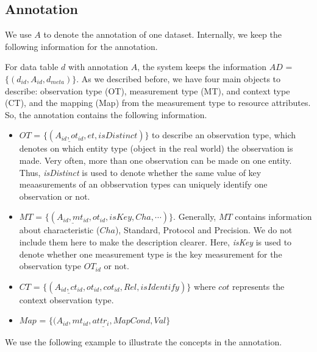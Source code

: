 \documentclass[conference]{IEEEtran}
\begin{document}
\subsection{Annotation}\label{sec:annotation}



We use $A$ to denote the annotation of one dataset. 
Internally, we keep the following information for the
annotation. 

For data table $d$ with annotation $A$, the system keeps the
information $AD$ = $\{(d_{id}, A_{id}, d_{meta})\}$.
As we described before, we have four main objects to describe: 
observation type (OT), measurement type (MT), and
context type (CT), and the mapping (Map) from the measurement type to
resource attributes.  
So, the annotation contains the following information. 

\begin{itemize}
\item $OT$ = $\{(\underline{A_{id},ot_{id}}, et, isDistinct)\}$ to
  describe an observation type, which denotes on which
  entity type (object in the real world) the observation is made. 
Very often, more than one observation can be made on one entity. Thus,{\em
  isDistinct} is used to denote whether the same value of key
meaasurements of an obbservation types can uniquely identify one
observation or not. 
\item $MT$ = $\{(\underline{A_{id}, mt_{id}}, ot_{id},isKey,
  Cha, \cdots)\}$. Generally, $MT$ contains information about
  characteristic ($Cha$), Standard, Protocol and Precision. We do not include them
  here to make the description clearer. Here, {\em isKey} is used to denote
  whether one measurement type is the key measurement for the
  observation type $OT_{id}$ or not. 
\item $CT$ = $\{(\underline{A_{id}, ct_{id}}, ot_{id}, cot_{id}, Rel,
  isIdentify)\}$ where $cot$ represents the context observation
  type. 
\item $Map$ = $\{(\underline{A_{id},mt_{id}, attr_i, MapCond},
  Val\}$
\end{itemize}

We use the following example to illustrate the concepts in the
annotation. 
\end{document}
